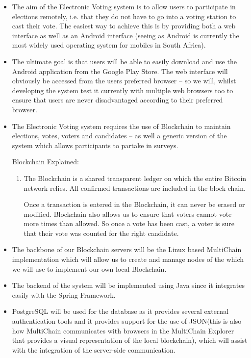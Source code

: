 \begin{itemize}
		\item The aim of the Electronic Voting system is to allow users to participate in elections remotely, i.e. that they do not have to go into a voting station to cast their vote. The easiest way to achieve this is by providing both a web interface as well as an Android interface (seeing as Android is currently the most widely used operating system for mobiles in South Africa). 
		
		\item The ultimate goal is that users will be able to easily download and use the Android application from the Google Play Store. The web interface will obviously be accessed from the users preferred browser – so we will, whilst developing the system test it currently with multiple web browsers too to ensure that users are never disadvantaged according to their preferred browser.  
		
		\item The Electronic Voting system requires the use of Blockchain to maintain elections, votes, voters and candidates – as well a generic version of the system which allows participants to partake in surveys. 
		
		Blockchain Explained: 
		\begin{enumerate}
			\item[] The Blockchain is a shared transparent ledger on which the entire Bitcoin network relies. All confirmed transactions are included in the block chain. 
			
			Once a transaction is entered in the Blockchain, it can never be erased or modified. Blockchain also allows us to ensure that voters cannot vote more times than allowed. So once a vote has been cast, a voter is sure that their vote was counted for the right candidate. 
		\end{enumerate}
		
		\item The backbone of our Blockchain servers will be the Linux based MultiChain implementation which will allow us to create and manage nodes of the which we will use to implement our own local Blockchain. 
		
		\item The backend of the system will be implemented using Java since it integrates easily with the Spring Framework.   			
		
		\item PostgreSQL will be used for the database as it provides several external authentication tools and it provides support for the use of JSON(this is also how MultiChain communicates with browsers in the MultiChain Explorer that provides a visual representation of the local blockchain), which will assist with the integration of the server-side communication. 
		

\end{itemize}
